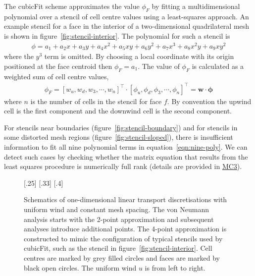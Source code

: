 \documentclass[a4paper,11pt]{article}
\begin{document}
The cubicFit scheme approximates the value $\phi_F$ by fitting a multidimensional polynomial over a stencil of cell centre values using a least-squares approach.  An example stencil for a face in the interior of a two-dimensional quadrilateral mesh is shown in figure~\ref{fig:stencil-interior}.
The polynomial for such a stencil is
\begin{align}
	\phi = a_1 + a_2 x + a_3 y + a_4 x^2 + a_5 xy + a_6 y^2 + a_7 x^3 + a_8 x^2 y + a_9 x y^2 \label{eqn:nine-poly}
\end{align}
where the $y^3$ term is omitted.
By choosing a local coordinate with its origin positioned at the face centroid then $\phi_F = a_1$.  The value of $\phi_F$ is calculated as a weighted sum of cell centre values,
\begin{align}
	\phi_F = \left[ w_u, w_d, w_3, \cdots, w_n \right]^\intercal \cdot
\left[ \phi_u, \phi_d, \phi_3, \cdots, \phi_n \right]^\intercal
	= \mathbf{w} \cdot \bm{\phi}
\end{align}
where $n$ is the number of cells in the stencil for face $f$.  By convention the upwind cell is the first component and the downwind cell is the second component.

For stencils near boundaries (figure~\ref{fig:stencil-boundary}) and for stencils in some distorted mesh regions (figure~\ref{fig:stencil-sloped}), there is insufficient information to fit all nine polynomial terms in equation~\eqref{eqn:nine-poly}.  We can detect such cases by checking whether the matrix equation that results from the least squares procedure is numerically full rank (details are provided in \href{http://www.datumedge.co.uk/publications/mc-report-2016-05.pdf}{MC3}).

\begin{figure}
	\centering
	[.25\linewidth]{}
	[.33\linewidth]{}
	[.4\linewidth]{}
	\caption{Schematics of one-dimensional linear transport discretisations with uniform wind and constant mesh spacing.  The von Neumann analysis starts with the 2-point approximation and subsequent analyses introduce additional points.  The 4-point approximation is constructed to mimic the configuration of typical stencils used by cubicFit, such as the stencil in figure~\ref{fig:stencil-interior}.  Cell centres are marked by grey filled circles and faces are marked by black open circles.  The uniform wind $u$ is from left to right.}
	\label{fig:vonNeumann}
\end{figure}
\end{document}
